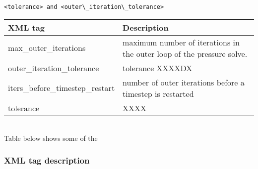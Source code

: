 \begin{Verbatim}[fontsize=\footnotesize]
<tolerance> and <outer\_iteration\_tolerance>
\end{Verbatim} 
%
\noindent
\footnotesize
\begin{tabular}{l p{8cm}}
XML tag &  Description\\
\hline
\hline
max\_outer\_iterations           &  maximum number of iterations in the outer loop of the pressure solve.\\
outer\_iteration\_tolerance      &  tolerance XXXXDX\\
iters\_before\_timestep\_restart &  \footnotesize number of outer iterations before a timestep is restarted\\
tolerance                        &   XXXX\\
\hline
\end{tabular}
\normalsize\\
%
Table below shows some of the

\normalsize
\subsubsection{XML tag description}





